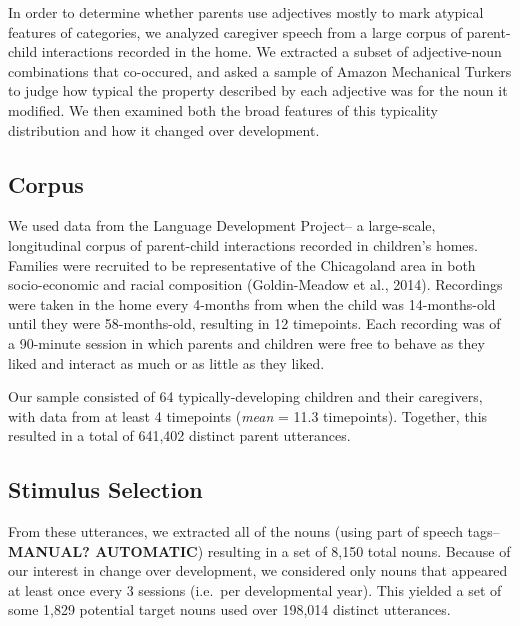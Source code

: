 \documentclass[10pt, letterpaper]{article}
\begin{document}
In order to determine whether parents use adjectives mostly to mark
atypical features of categories, we analyzed caregiver speech from a
large corpus of parent-child interactions recorded in the home. We
extracted a subset of adjective-noun combinations that co-occured, and
asked a sample of Amazon Mechanical Turkers to judge how typical the
property described by each adjective was for the noun it modified. We
then examined both the broad features of this typicality distribution
and how it changed over development.

\hypertarget{corpus}{%
\subsection{Corpus}\label{corpus}}

We used data from the Language Development Project-- a large-scale,
longitudinal corpus of parent-child interactions recorded in children's
homes. Families were recruited to be representative of the Chicagoland
area in both socio-economic and racial composition (Goldin-Meadow et
al., 2014). Recordings were taken in the home every 4-months from when
the child was 14-months-old until they were 58-months-old, resulting in
12 timepoints. Each recording was of a 90-minute session in which
parents and children were free to behave as they liked and interact as
much or as little as they liked.

Our sample consisted of 64 typically-developing children and their
caregivers, with data from at least 4 timepoints (\emph{mean} = 11.3
timepoints). Together, this resulted in a total of 641,402 distinct
parent utterances.

\hypertarget{stimulus-selection}{%
\subsection{Stimulus Selection}\label{stimulus-selection}}

From these utterances, we extracted all of the nouns (using part of
speech tags--\textbf{MANUAL? AUTOMATIC}) resulting in a set of 8,150
total nouns. Because of our interest in change over development, we
considered only nouns that appeared at least once every 3 sessions
(i.e.~per developmental year). This yielded a set of some 1,829
potential target nouns used over 198,014 distinct utterances.
\end{document}

